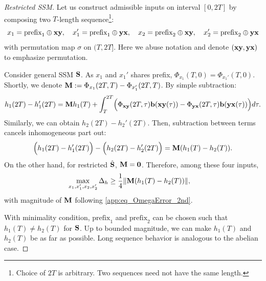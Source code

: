 \begin{proof}[Restricted SSM]
    Let us construct admissible inputs on interval $[0,2T]$ by composing two $T$-length sequence\footnote{
    Choice of $2T$ is arbitrary. Two sequences need not have the same length.
    }:
    \begin{equation*}
        x_1 = \text{prefix}_1 \oplus \mathbf{xy},
        \quad
        x_1' = \text{prefix}_1 \oplus \mathbf{yx},
        \quad
        x_2 = \text{prefix}_2 \oplus \mathbf{xy},
        \quad
        x_2' = \text{prefix}_2 \oplus \mathbf{yx}
    \end{equation*}
    with permutation map $\sigma$ on $(T, 2T]$.
    Here we abuse notation and denote $(\mathbf{xy}, \mathbf{yx})$ to emphasize permutation.
    
    Consider general SSM $\mathbf{S}$.
    As $x_1$ and $x_1'$ shares prefix, $\Phi_{x_1}(T,0) = \Phi_{x_1'}(T,0)$.
    Shortly, we denote $\mathbf{M} := \Phi_{x_1}(2T,T) - \Phi_{x_1'}(2T,T)$.
    By simple subtraction:
    \begin{align*}
        h_1(2T) - h_1'(2T)
        =
        \mathbf{M}h_1(T)
        +
        \int_T^{2T}
        \Bigl(
        \Phi_{\mathbf{xy}}(2T, \tau)\mathbf{b}(\mathbf{xy}(\tau))
        -
        \Phi_{\mathbf{yx}}(2T, \tau)\mathbf{b}(\mathbf{yx}(\tau))
        \Bigr) d\tau.
    \end{align*}
    Similarly, we can obtain $h_2(2T) - h_2'(2T)$.
    Then, subtraction between terms cancels inhomogeneous part out:
    \begin{equation}
    \label{app:eq_subtraction_magic}
        \Bigl(
        h_1(2T) - h_1'(2T)
        \Bigr)
        -
        \Bigl(
        h_2(2T) - h_2'(2T)
        \Bigr)
        =
        \mathbf{M}
        (h_1(T) - h_2(T)).
    \end{equation}
    On the other hand, for restricted $\hat{\mathbf{S}}$, $\mathbf{M} = \mathbf{0}$.
    Therefore, among these four inputs,
    \begin{align}
    \label{app:eq_inhomogeneous_error}
        \max_{x_1,x_1', x_2, x_2'} \Delta_h
        &\ge \frac{1}{4} \|\mathbf{M}
        (h_1(T) - h_2(T))\|,
    \end{align}
    with magnitude of $\mathbf{M}$ following \cref{app:eq_OmegaError_2nd}.
    
    With minimality condition,
    $\text{prefix}_1$ and $\text{prefix}_2$ can be chosen such that $h_1(T) \neq h_2(T)$ for $\mathbf{S}$.
    Up to bounded magnitude, we can make $h_1(T)$ and $h_2(T)$ be as far as possible.
    Long sequence behavior is analogous to the abelian case.
\end{proof}
